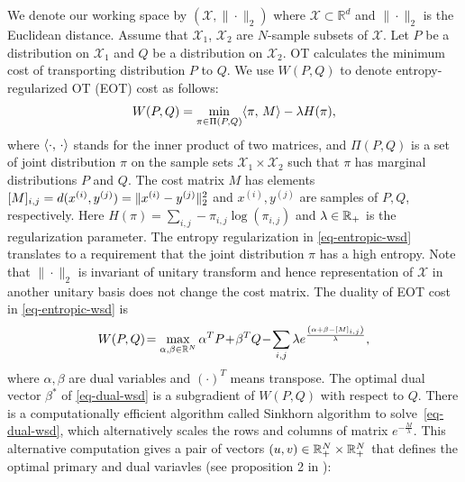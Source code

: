 We denote our working space by $(\mathcal{X},\|\cdot\|_2)$ where
$\mathcal{X}\subset\mathbb{R}^d$ and $\|\cdot\|_2$ is the Euclidean
distance. Assume that $\mathcal{X}_1$, $\mathcal{X}_2$ are $N$-sample
subsets of $\mathcal{X}$. Let $P$ be a distribution on $\mathcal{X}_1$
and $Q$ be a distribution on $\mathcal{X}_2$. OT calculates the
minimum cost of transporting distribution $P$ to $Q$. We use $W(P,Q)$ to denote entropy-regularized OT (EOT) cost as follows:\vspace{-2pt}
\begin{equation}\label{eq-entropic-wsd}
  W(P,Q)=\min_{ \pi \in \Pi(P,Q)} \dotp{\pi}{M} - \la H(\pi),\vspace{-2pt}
\end{equation}
where $\langle \cdot,\,\cdot\rangle$ stands for the inner product of
two matrices, and $\Pi(P,Q)$ is a set of joint distribution $\pi$ on
the sample sets $\mathcal{X}_1\times\mathcal{X}_2$ such that $\pi$ has
marginal distributions $P$ and $Q$. 
The cost matrix $M$ has elements $[M]_{i,j} = d(x^{(i)}, y^{(j)}) = \| x^{(i)} - y^{(j)} \|_{2}^2$ and $x^{(i)}, y^{(j)}$ are
samples of $P, Q$, respectively. Here $H(\pi) = \sum_{i,j} -\pi_{i,j}
\log(\pi_{i,j})$ and $\lambda \in \mathbb{R}_{+}$ is the regularization
parameter. The entropy regularization in \eqref{eq-entropic-wsd}  translates 
to a requirement that the joint distribution $\pi$ has a high entropy. 
Note that $\|\cdot\|_2$ is invariant of unitary transform and hence
representation of $\mathcal{X}$ in another unitary basis does not
change the cost matrix. The duality of EOT cost in \eqref{eq-entropic-wsd} is\vspace{-2pt}
\begin{equation}\label{eq-dual-wsd}
  W(P,Q) \! =  \max_{\al, \be \in \mathbb{R}^{N}} \al^{T}P \! + \! \beta^{T}Q \! - \!
  \sum_{i,j} \lambda e^{ \frac{{\left( \al + \beta - [M]_{i,j} \right)}}{\la} },\vspace{-2pt}
\end{equation}
where $\alpha,\beta$ are dual variables and $(\cdot)^T$ means transpose. The optimal dual vector $\beta^{\ast}$
of \eqref{eq-dual-wsd} is a subgradient of $W(P,Q)$ with respect to $Q$.
There is a computationally efficient algorithm called Sinkhorn
algorithm\cite{2013arXiv1306.0895C, 2013arXiv1310.4375C} to
solve~\eqref{eq-dual-wsd}, which alternatively scales the rows and columns of matrix $e^{-\frac{M}{\lambda}}$. This alternative computation gives a pair of vectors $(u, v) \in \mathbb{R}^N_{+} \times \mathbb{R}^N_{+}$ that defines the optimal primary and dual variavles (see proposition 2 in \cite{2013arXiv1310.4375C}): \vspace{-2pt}
